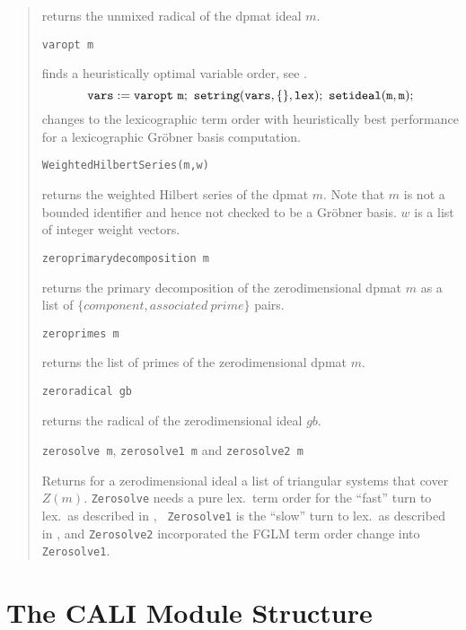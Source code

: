 \documentclass[a4paper,11pt]{article}
\newcommand{\gr}{Gr\"obner}
\newcommand{\pbx}[1]{\mbox{}\hfill \parbox[t]{12cm}{#1} \pagebreak[3]}
\begin{document}
\begin{quote}
\pbx{returns the unmixed radical of the dpmat ideal $m$.}

\verb|varopt m| 

\pbx{finds a heuristically optimal variable order, see \cite{BGK}. 
\[\tt vars:=varopt\ m;\ setring(vars,\{\},lex);\ setideal(m,m);\]
changes to the lexicographic term order with heuristically best
performance for a lexicographic {\gr} basis computation.}

\verb|WeightedHilbertSeries(m,w)| 

\pbx{returns the weighted Hilbert series of the dpmat $m$. Note that
$m$ is not a bounded identifier and hence not checked to be a {\gr}
basis. $w$ is a list of integer weight vectors.} 

\verb|zeroprimarydecomposition m| 

\pbx{returns the primary decomposition of the zerodimensional dpmat
$m$ as a list of $\{component, associated\ prime\}$ pairs.}

\verb|zeroprimes m| 

\pbx{returns the list of primes of the zerodimensional dpmat $m$.}

\verb|zeroradical gb| 

\pbx{returns the radical of the zerodimensional ideal $gb$.}

\verb|zerosolve m|, \verb|zerosolve1 m| and  \verb|zerosolve2 m| 

\pbx{Returns for a zerodimensional ideal a list of triangular systems
that cover $Z(m)$. {\tt Zerosolve} needs a pure lex.\ term order for
the ``fast'' turn to lex.\ as described in \cite{Moeller}, {\tt
Zerosolve1} is the ``slow'' turn to lex.\ as described in \cite{efgb},
and {\tt Zerosolve2} incorporated the FGLM term order change into {\tt
Zerosolve1}.} 
\end{quote}
\pagebreak


\section{The CALI Module Structure}
\vfill
\end{document}
